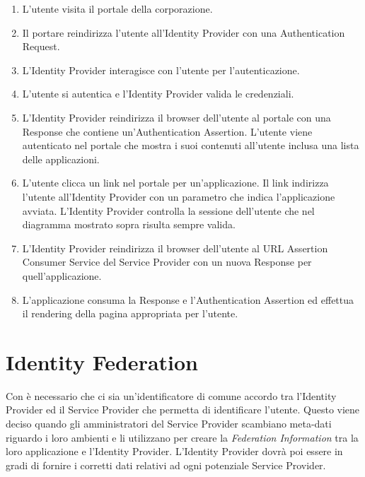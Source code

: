 \begin{enumerate}
      \item L'utente visita il portale della corporazione.
      \item Il portare reindirizza l'utente all'Identity Provider con una \saml{}
            Authentication Request.
      \item L'Identity Provider interagisce con l'utente per l'autenticazione.
      \item L'utente si autentica e l'Identity Provider valida le credenziali.
      \item L'Identity Provider reindirizza il browser dell'utente al portale con
            una \saml{} Response che contiene un'Authentication Assertion. L'utente
            viene autenticato nel portale che mostra i suoi contenuti all'utente
            inclusa una lista delle applicazioni.
      \item L'utente clicca un link nel portale per un'applicazione. Il link
            indirizza l'utente all'Identity Provider con un parametro che indica
            l'applicazione avviata. L'Identity Provider controlla la sessione
            dell'utente che nel diagramma mostrato sopra risulta sempre valida.
      \item L'Identity Provider reindirizza il browser dell'utente al URL Assertion
            Consumer Service del Service Provider con un nuova \saml{} Response per
            quell'applicazione.
      \item L'applicazione consuma la \saml{} Response e l'Authentication Assertion ed
            effettua il rendering della pagina appropriata per l'utente.
\end{enumerate}

\section{Identity Federation}

Con \saml{} è necessario che ci sia un'identificatore di comune accordo tra
l'Identity Provider ed il Service Provider che permetta di identificare l'utente.
Questo viene deciso quando gli amministratori del Service Provider scambiano
meta-dati riguardo i loro ambienti e li utilizzano per creare
la \textit{Federation Information} tra la loro applicazione e l'Identity Provider.
L'Identity Provider dovrà poi essere in gradi di fornire i corretti dati relativi
ad ogni potenziale Service Provider.

